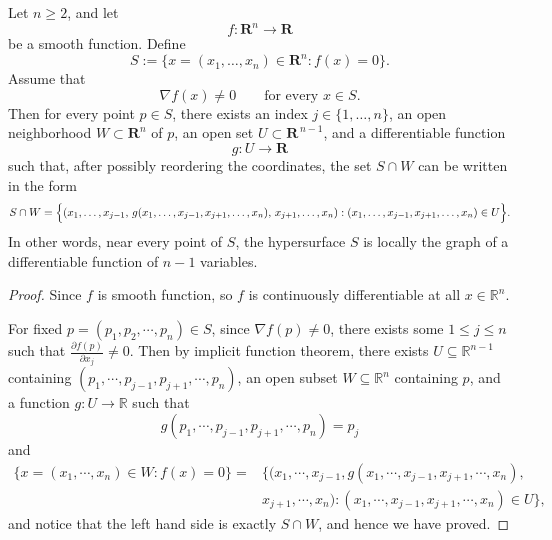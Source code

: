 \begin{problem}

Let \(n\ge 2\), and let
\[
f:\mathbf{R}^n\to \mathbf{R}
\]
be a smooth function. Define
\[
S:=\{x=(x_1,\dots,x_n)\in \mathbf{R}^n : f(x)=0\}.
\]
Assume that
\[
\nabla f(x)\neq 0
\qquad\text{for every }x\in S.
\]
Then for every point \(p\in S\), there exists an index \(j\in\{1,\dots,n\}\), an open neighborhood
\(W\subset \mathbf{R}^n\) of \(p\), an open set \(U\subset \mathbf{R}^{\,n-1}\), and a differentiable
function
\[
g:U\to \mathbf{R}
\]
such that, after possibly reordering the coordinates, the set \(S\cap W\) can be written in the form
\[
S\cap W
=
\Bigl\{
(x_1,\dots,x_{j-1},\, g(x_1,\dots,x_{j-1},x_{j+1},\dots,x_n),\, x_{j+1},\dots,x_n)
:
(x_1,\dots,x_{j-1},x_{j+1},\dots,x_n)\in U
\Bigr\}.
\]
In other words, near every point of \(S\), the hypersurface \(S\) is locally the graph of a differentiable
function of \(n-1\) variables.
\end{problem}

\begin{proof}
    Since $f$ is smooth function, so $f$ is continuously differentiable at all $x \in \mathbb{R}^n$.

    For fixed $p  = (p_1, p_2, \cdots, p_n) \in S$, since $\nabla f(p) \neq 0$, there exists some $1 \le j \le n$ such that $\frac{\partial f(p)}{\partial x_j} \ne 0$. Then by implicit function theorem, there exists $U \subseteq \mathbb{R}^{n-1}$ containing $(p_1,\cdots, p_{j-1}, p_{j+1}, \cdots, p_n)$, an open subset $W \subseteq \mathbb{R}^n$ containing $p$, and a function $g : U \to \mathbb{R}$ such that 
    \[
        g(p_1,\cdots, p_{j-1}, p_{j+1}, \cdots, p_n) = p_j
    \]
    and
    \[
    \begin{aligned}
    \{x = (x_1, \cdots, x_n) \in W : f(x) = 0\}
    = {} & \{(x_1,\cdots, x_{j-1},g(x_1,\cdots, x_{j-1},x_{j+1},\cdots,x_n), \\
    & x_{j+1},\cdots,x_n) :
    (x_1,\cdots, x_{j-1},x_{j+1},\cdots,x_n) \in U\},
    \end{aligned}
    \]
    and notice that the left hand side is exactly $S \cap W$, and hence we have proved.
\end{proof}

